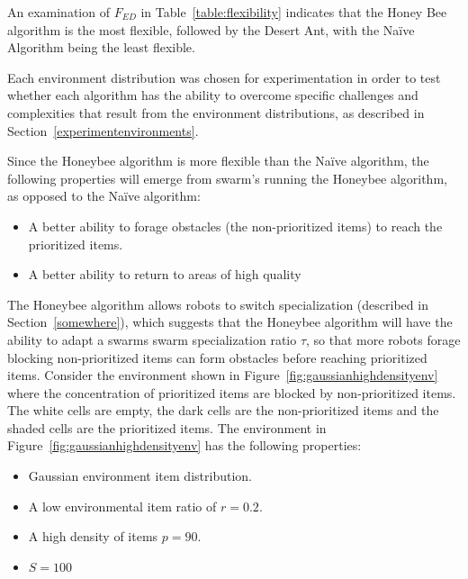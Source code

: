 An examination of $F_{ED}$ in Table~\ref{table:flexibility} indicates that the Honey Bee algorithm is the most flexible, followed by the Desert Ant, with the Na\"ive Algorithm being the least flexible.

Each environment distribution was chosen for experimentation in order to test whether each algorithm has the ability to overcome specific challenges and complexities that result from the environment distributions, as described in Section~\ref{experimentenvironments}.

Since the Honeybee algorithm is more flexible than the Na\"ive algorithm, the following properties will emerge from swarm's running the Honeybee algorithm, as opposed to the Na\"ive algorithm:
\begin{itemize}
\item A better ability to forage obstacles (the non-prioritized items) to reach the prioritized items.
\item A better ability to return to areas of high quality
\end{itemize}
 
The Honeybee algorithm allows robots to switch specialization (described in Section~\ref{somewhere}), which suggests that the Honeybee algorithm will have the ability to adapt a swarms swarm specialization ratio $\tau$, so that more robots forage blocking non-prioritized items can form obstacles before reaching prioritized items. Consider the environment shown in Figure~\ref{fig:gaussianhighdensityenv} where the concentration of prioritized items are blocked by non-prioritized items. The white cells are empty, the dark cells are the non-prioritized items and the shaded cells are the prioritized items. The environment in Figure~\ref{fig:gaussianhighdensityenv} has the following properties:

\begin{itemize}
\item Gaussian environment item distribution.
\item A low environmental item ratio of $r=0.2$.
\item A high density of items $p=90$.
\item $S=100$
\end{itemize}

